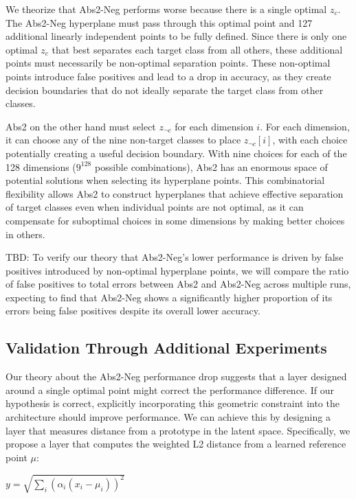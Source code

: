We theorize that Abs2-Neg performs worse because there is a single optimal $z_c$. The Abs2-Neg hyperplane must pass through this optimal point and 127 additional linearly independent points to be fully defined. Since there is only one optimal $z_c$ that best separates each target class from all others, these additional points must necessarily be non-optimal separation points. These non-optimal points introduce false positives and lead to a drop in accuracy, as they create decision boundaries that do not ideally separate the target class from other classes.

Abs2 on the other hand must select $z_{\neg c}$ for each dimension $i$. For each dimension, it can choose any of the nine non-target classes to place $z_{\neg c}[i]$, with each choice potentially creating a useful decision boundary. With nine choices for each of the 128 dimensions ($9^{128}$ possible combinations), Abs2 has an enormous space of potential solutions when selecting its hyperplane points. This combinatorial flexibility allows Abs2 to construct hyperplanes that achieve effective separation of target classes even when individual points are not optimal, as it can compensate for suboptimal choices in some dimensions by making better choices in others.

TBD: To verify our theory that Abs2-Neg's lower performance is driven by false positives introduced by non-optimal hyperplane points, we will compare the ratio of false positives to total errors between Abs2 and Abs2-Neg across multiple runs, expecting to find that Abs2-Neg shows a significantly higher proportion of its errors being false positives despite its overall lower accuracy.

\subsection{Validation Through Additional Experiments}

Our theory about the Abs2-Neg performance drop suggests that a layer designed around a single optimal point might correct the performance difference. If our hypothesis is correct, explicitly incorporating this geometric constraint into the architecture should improve performance. We can achieve this by designing a layer that measures distance from a prototype in the latent space. Specifically, we propose a layer that computes the weighted L2 distance from a learned reference point $\mu$:

$y = \sqrt{\sum_i (\alpha_i(x_i - \mu_i))^2}$

